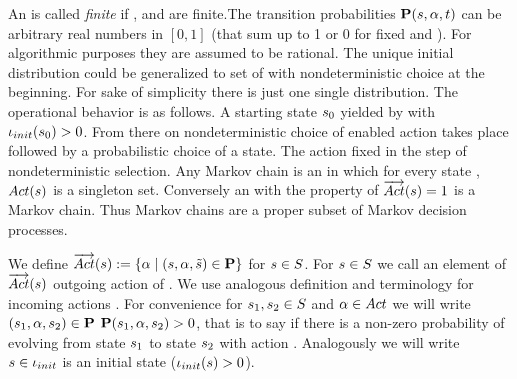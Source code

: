 \documentclass[preview]{standalone}
\begin{document}
An \mdpN is called \emph{finite} if \states, \actions and \atomicprops are finite.The transition probabilities ${\textbf{P}}({s}, {\alpha}, t)$ can be arbitrary real numbers in $[0,1]$ (that sum up to 1 or 0 for fixed \state and \action). For algorithmic purposes they are assumed to be rational.  The unique initial distribution \initdistrib could be generalized to set of \initdistrib with nondeterministic choice at the beginning. For sake of simplicity there is just one single distribution. The operational behavior is as follows. A starting state ${s}_0$ yielded by \initdistrib with ${\iota_{init}}({s}_0) > 0$. From there on nondeterministic choice of enabled action takes place followed by a probabilistic choice of a state. The action fixed in the step of nondeterministic selection. Any Markov chain is an \mdpN in which for every state \state, ${Act}({s})$ is a singleton set. Conversely an \mdpN with the property of ${\overrightarrow{{Act}}}({s}) = 1$ is a Markov chain. Thus Markov chains are a proper subset of Markov decision processes.

We define ${\overrightarrow{{Act}}}({s}) := \{{\alpha} \mid ({s},{\alpha},{\tilde{{s}}}) \in {\ensuremath{{\textbf{P}}}}\}$ for ${s} \in {S}$. For ${s} \in {S}$ we call an element of ${\overrightarrow{{Act}}}({s})$ outgoing action of \state. We use analogous definition and terminology for incoming actions \inacts. For convenience for ${s}_1, {s}_2 \in {S}$ and ${\alpha} \in {Act}$ we will write $({s}_1, {\alpha}, {s}_2) \in {\textbf{P}}$ \iffN ${\textbf{P}}({s}_1, {\alpha}, {s}_2) > 0$, that is to say if there is a non-zero probability of evolving from state ${s}_1$ to state ${s}_2$ with action \action. Analogously we will write ${s} \in {\iota_{init}}$ \iffN is an initial state (${\iota_{init}}({s}) > 0$). 
\end{document}
